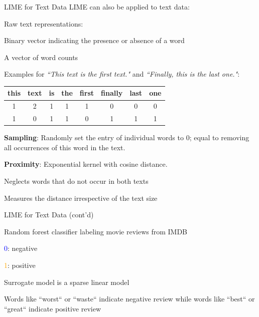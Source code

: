 \documentclass[10pt,compress,t,notes=noshow, xcolor=table]{beamer}
\begin{document}
\begin{framev}[align=top]{LIME for Text Data }
LIME can also be applied to text data:
\begin{itemizeM}
\item Raw text representations:
\begin{itemizeS}
\item Binary vector indicating the presence or absence of a word
\item A vector of word counts
\end{itemizeS}
\item Examples for \textit{``This text is the first text."} and \textit{``Finally, this is the last one."}:
\begin{center}
\begin{tabular}{c|c|c|c|c|c|c|c}
this & text & is & the & first & finally & last & one \\
\hline
1 & 2 & 1 & 1 & 1 & 0 & 0 & 0 \\
1 & 0 & 1 & 1 & 0 & 1 & 1 & 1 \\
\end{tabular}
\end{center}
\item \textbf{Sampling}: Randomly set the entry of individual words to $0$; equal to removing all occurrences of this word in the text.
\item \textbf{Proximity}: Exponential kernel with cosine distance.
\begin{itemizeS}
\item Neglects words that do not occur in both texts
\item Measures the distance irrespective of the text size
\end{itemizeS}
\end{itemizeM}
\end{framev}


\begin{framev}[align=top]{LIME for Text Data (cont'd) }
\begin{itemizeM}
\item Random forest classifier labeling movie reviews from IMDB
\begin{itemizeS}
\item \textcolor{blue}{0}: negative
\item \textcolor{orange}{1}: positive
\end{itemizeS}
\item Surrogate model is a sparse linear model
\end{itemizeM}
\spacer[0.25]
Words like ``worst`` or ``waste`` indicate negative review while words like ``best`` or ``great`` indicate positive review
\end{framev}
\end{document}
